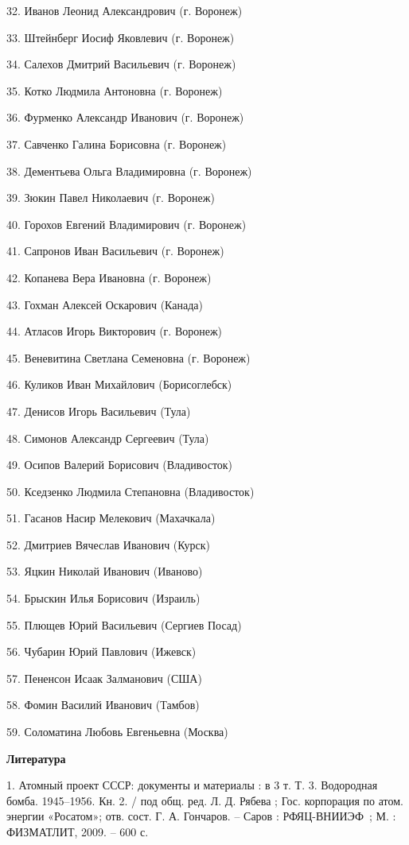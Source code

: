 32.	Иванов Леонид Александрович (г. Воронеж)

33.	Штейнберг Иосиф Яковлевич (г. Воронеж)

34.	Салехов Дмитрий Васильевич (г. Воронеж)

35.	Котко Людмила Антоновна (г. Воронеж)

36.	Фурменко Александр Иванович (г. Воронеж)

37.	Савченко Галина Борисовна (г. Воронеж)

38.	Дементьева Ольга Владимировна (г. Воронеж)

39.	Зюкин Павел Николаевич (г. Воронеж)

40.	Горохов Евгений Владимирович (г. Воронеж)

41.	Сапронов Иван Васильевич (г. Воронеж)

42.	Копанева Вера Ивановна (г. Воронеж)

43.	Гохман Алексей Оскарович (Канада)

44.	Атласов Игорь Викторович (г. Воронеж)

45.	Веневитина Светлана Семеновна (г. Воронеж)

46.	Куликов Иван Михайлович (Борисоглебск)

47.	Денисов Игорь Васильевич (Тула)

48.	Симонов Александр Сергеевич (Тула)

49.	Осипов Валерий Борисович (Владивосток)

50.	Кседзенко Людмила Степановна (Владивосток)

51.	Гасанов Насир Мелекович (Махачкала)

52.	Дмитриев Вячеслав Иванович (Курск)

53.	Яцкин Николай Иванович (Иваново)

54.	Брыскин Илья Борисович (Израиль)

55.	Плющев Юрий Васильевич (Сергиев Посад)

56.	Чубарин Юрий Павлович (Ижевск)

57.	Пененсон Исаак Залманович (США)

58.	Фомин Василий Иванович (Тамбов)

59.	Соломатина Любовь Евгеньевна (Москва)


\smallskip \centerline {\bf Литература} \nopagebreak

1.	Атомный проект СССР: документы и материалы : в 3 т. Т. 3. Водородная бомба. 1945–1956. Кн. 2. / под общ. ред. Л. Д. Рябева ; Гос. корпорация по атом. энергии «Росатом»; отв. сост. Г. А. Гончаров. – Саров : РФЯЦ-ВНИИЭФ~; М. : ФИЗМАТЛИТ, 2009. – 600 с.

